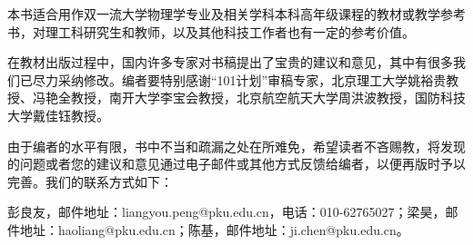本书适合用作双一流大学物理学专业及相关学科本科高年级课程的教材或教学参考书，对理工科研究生和教师，以及其他科技工作者也有一定的参考价值。

在教材出版过程中，国内许多专家对书稿提出了宝贵的建议和意见，其中有很多我们已尽力采纳修改。编者要特别感谢“101计划”审稿专家，北京理工大学姚裕贵教授、冯艳全教授，南开大学李宝会教授，北京航空航天大学周洪波教授，国防科技大学戴佳钰教授。

由于编者的水平有限，书中不当和疏漏之处在所难免，希望读者不吝赐教，将发现的问题或者您的建议和意见通过电子邮件或其他方式反馈给编者，以便再版时予以完善。我们的联系方式如下：

彭良友，邮件地址：liangyou.peng@pku.edu.cn，电话：010-62765027；梁昊，邮件地址：haoliang@pku.edu.cn；陈基，邮件地址：ji.chen@pku.edu.cn。
\clearpage
